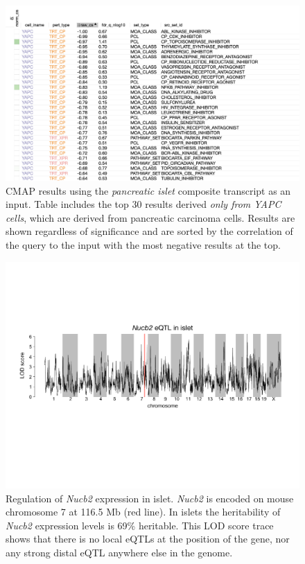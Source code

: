 \documentclass[
]{article}
\begin{document}
\begin{figure}[ht!]
\includegraphics[width=\textwidth]{Figures/Supp_Fig_Islet_YAPC.png} 
\caption{CMAP results using the \textit{pancreatic islet} composite 
transcript as an input. Table includes the top 30 results derived
\textit{only from YAPC cells}, which are derived from pancreatic
carcinoma cells. Results are shown regardless of significance and
are sorted by the correlation of the query to the input 
with the most negative results at the top.
}
\label{fig:clue_islet_yapc}
\end{figure}

\begin{figure}[ht!]
\includegraphics[width=\textwidth]{Figures/Supplemental_FigX_Nucb2_eQTL.pdf} 
\caption{Regulation of \textit{Nucb2} expression in islet. \textit{Nucb2} 
is encoded on mouse chromosome 7 at 116.5 Mb (red line). In islets the 
heritability of \textit{Nucb2} expression levels is 69\% heritable. This 
LOD score trace shows that there is no local eQTLs at the position of the
gene, nor any strong distal eQTL anywhere else in the genome. 
}
\label{fig:Nucb2_eqtl}
\end{figure}

\clearpage



\end{document}
